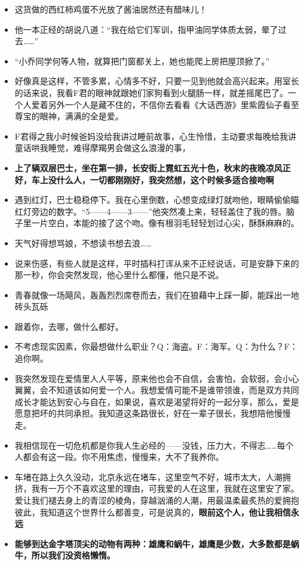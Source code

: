 \documentclass[UTF8,a4paper,8pt]{ctexbook}
\begin{document}
\begin{itemize}
			\item 这货做的西红柿鸡蛋不光放了酱油居然还有醋味儿！
			\item 他一本正经的胡说八道：“我在给它们军训，指甲油同学体质太弱，晕了过去……”
			\item “小乔同学何等人物，就算把门窗都关上，她也能爬上房把屋顶掀了。”
			\item 好像真是这样，不管多累，心情多不好，只要一见到他就会高兴起来。用室长的话来说，我看F君的眼神就跟她们家狗看到火腿肠一样，就差摇尾巴了。一个人爱着另外一个人是藏不住的，不信你去看看《大话西游》里紫霞仙子看至尊宝的眼神，满满的全是爱。
			\item F君得之我小时候爸妈没给我讲过睡前故事，心生怜惜，主动要求每晚给我讲童话哄我睡觉，难得摩羯男会做这么浪漫的事，
			\item \textbf{上了辆双层巴士，坐在第一排，长安街上霓虹五光十色，秋末的夜晚凉风正好，车上没什么人，一切都刚刚好，我突然想，这个时候多适合接吻啊}
			\item 遇到红灯，巴士稳稳停下。我在心里倒数，心想变成绿灯就吻他，眼睛偷偷瞄红灯旁边的数字。“5——4——3——”他突然凑上来，轻轻盖住了我的唇。脑子里一片空白，本能的接了这个吻。像有根羽毛轻轻划过心尖，酥酥麻麻的。
			\item 天气好得想骂娘，不想读书想去浪……
			\item 说来伤感，有些人就是这样，平时插科打诨从来不正经说话，可是安静下来的那一秒，你会突然发现，他心里什么都懂，他只是不说。
			\item 青春就像一场飓风，轰轰烈烈席卷而去，我们在狼藉中上踩一脚，能踩出一地砖头瓦砾
			\item 跟着你，去哪，做什么都好。
			\item 不考虑现实因素，你最想做什么职业？Q：海盗。F：海军。Q：为什么？F：追你啊。
			\item 我突然发现在爱情里人人平等，原来他也会不自信，会害怕，会软弱，会小心翼翼，会不知道该如何爱一个人。我想爱情可能不是谁带领谁，而是双方共同成长才能达到安心与自在，如果说，喜欢是渴望将好的一起分享，那么，爱是愿意把坏的共同承担。我知道这条路很长，好在一辈子很长，我想陪他慢慢走。
			\item 我相信现在一切危机都是你我人生必经的——没钱，压力大，不得志……每个人都会有这一段。你不用焦虑，慢慢来，大不了我养你。
			\item 车堵在路上久久没动，北京永远在堵车，这里空气不好，城市太大，人潮拥挤，我有一万个不喜欢这里的理由，可我爱的人在这里，我就在这里安了家。爱让我们褪去身上的青涩的棱角，穿越汹涌的人潮，用最温柔最炙热的爱拥抱彼此，我知道这个世界什么都善变，可是说真的，\textbf{眼前这个人，他让我相信永远}
			\item \textbf{能够到达金字塔顶尖的动物有两种：雄鹰和蜗牛，雄鹰是少数，大多数都是蜗牛，所以我们没资格懒惰。}
		\end{itemize}
\end{document}
